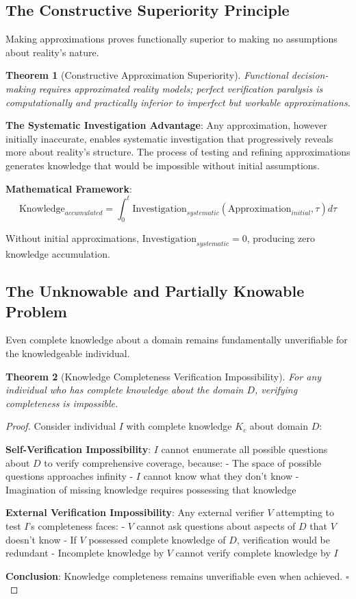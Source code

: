 \documentclass[12pt,a4paper]{article}
\newtheorem{theorem}{Theorem}
\begin{document}
\subsection{The Constructive Superiority Principle}

Making approximations proves functionally superior to making no assumptions about reality's nature.

\begin{theorem}[Constructive Approximation Superiority]
Functional decision-making requires approximated reality models; perfect verification paralysis is computationally and practically inferior to imperfect but workable approximations.
\end{theorem}

\textbf{The Systematic Investigation Advantage}: Any approximation, however initially inaccurate, enables systematic investigation that progressively reveals more about reality's structure. The process of testing and refining approximations generates knowledge that would be impossible without initial assumptions.

\textbf{Mathematical Framework}:
$$\text{Knowledge}_{accumulated} = \int_0^t \text{Investigation}_{systematic}(\text{Approximation}_{initial}, \tau) d\tau$$

Without initial approximations, $\text{Investigation}_{systematic} = 0$, producing zero knowledge accumulation.

\subsection{The Unknowable and Partially Knowable Problem}

Even complete knowledge about a domain remains fundamentally unverifiable for the knowledgeable individual.

\begin{theorem}[Knowledge Completeness Verification Impossibility]
For any individual who has complete knowledge about the domain $D$, verifying completeness is impossible.
\end{theorem}

\begin{proof}
Consider individual $I$ with complete knowledge $K_c$ about domain $D$:

\textbf{Self-Verification Impossibility}: $I$ cannot enumerate all possible questions about $D$ to verify comprehensive coverage, because:
- The space of possible questions approaches infinity
- $I$ cannot know what they don't know  
- Imagination of missing knowledge requires possessing that knowledge

\textbf{External Verification Impossibility}: Any external verifier $V$ attempting to test $I$'s completeness faces:
- $V$ cannot ask questions about aspects of $D$ that $V$ doesn't know
- If $V$ possessed complete knowledge of $D$, verification would be redundant
- Incomplete knowledge by $V$ cannot verify complete knowledge by $I$

\textbf{Conclusion}: Knowledge completeness remains unverifiable even when achieved. $\square$
\end{proof}
\end{document}

